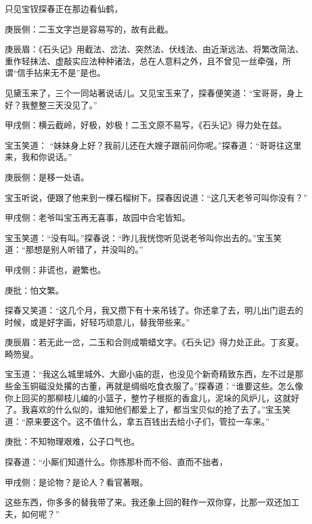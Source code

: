 \begin{parag}
    只见宝钗探春正在那边看仙鹤，\begin{note}庚辰侧：二玉文字岂是容易写的，故有此截。\end{note}\begin{note}庚辰眉：《石头记》用截法、岔法、突然法、伏线法、由近渐远法、将繁改简法、重作轻抹法、虚敲实应法种种诸法，总在人意料之外，且不曾见一丝牵强，所谓“信手拈来无不是”是也。\end{note}见黛玉来了，三个一同站著说话儿。又见宝玉来了，探春便笑道：“宝哥哥，身上好？我整整三天没见了。”\begin{note}甲戌侧：横云截岭，好极，妙极！二玉文原不易写，《石头记》得力处在兹。\end{note}宝玉笑道： “妹妹身上好？我前儿还在大嫂子跟前问你呢。”探春道：“哥哥往这里来，我和你说话。”\begin{note}庚辰侧：是移一处语。\end{note}宝玉听说，便跟了他来到一棵石榴树下。探春因说道：“这几天老爷可叫你没有？”\begin{note}甲戌侧：老爷叫宝玉再无喜事，故园中合宅皆知。\end{note}宝玉笑道：“没有叫。”探春说：“昨儿我恍惚听见说老爷叫你出去的。”宝玉笑道：“那想是别人听错了，并没叫的。”\begin{note}甲戌侧：非谎也，避繁也。\end{note}\begin{note}庚批：怕文繁。\end{note}探春又笑道：“这几个月，我又攒下有十来吊钱了。你还拿了去，明儿出门逛去的时候，或是好字画，好轻巧顽意儿，替我带些来。”\begin{note}庚辰眉：若无此一岔，二玉和合则成嚼蜡文字。《石头记》得力处正此。丁亥夏。畸笏叟。\end{note}宝玉道：“我这么城里城外、大廊小庙的逛，也没见个新奇精致东西，左不过是那些金玉铜磁没处撂的古董，再就是绸缎吃食衣服了。”探春道：“谁要这些。怎么像你上回买的那柳枝儿编的小篮子，整竹子根抠的香盒儿，泥垛的风炉儿，这就好了。我喜欢的什么似的，谁知他们都爱上了，都当宝贝似的抢了去了。”宝玉笑道：“原来要这个。这不值什么，拿五百钱出去给小子们，管拉一车来。”\begin{note}庚批：不知物理艰难，公子口气也。\end{note}探春道：“小厮们知道什么。你拣那朴而不俗、直而不拙者，\begin{note}甲戌侧：是论物？是论人？看官著眼。\end{note}这些东西，你多多的替我带了来。我还象上回的鞋作一双你穿，比那一双还加工夫，如何呢？”
\end{parag}


